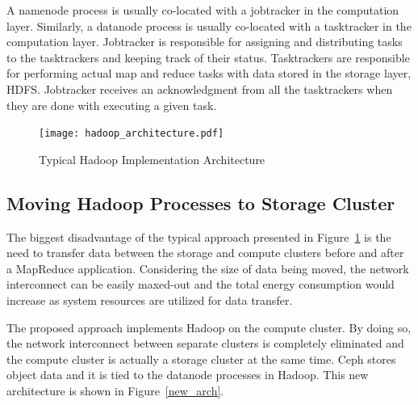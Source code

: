 \documentclass[preprint,12pt]{elsarticle}
\begin{document}
A namenode process is usually co-located with a jobtracker in the computation layer. Similarly,
a datanode process is usually co-located with a tasktracker in the computation layer. Jobtracker
is responsible for assigning and distributing tasks to the tasktrackers and keeping track of
their status. Tasktrackers are responsible for performing actual map and reduce tasks with
data stored in the storage layer, HDFS. Jobtracker receives an acknowledgment from all the
tasktrackers when they are done with executing a given task.

\begin{figure}[!htbp]
\centering
\texttt{[image: hadoop\_architecture.pdf]}
\caption{Typical Hadoop Implementation Architecture}
\label{hadoop_arch}
\end{figure}

\subsection{Moving Hadoop Processes to Storage Cluster}
The biggest disadvantage of the typical approach presented in Figure~\ref{hadoop_arch}
is the need to transfer data between the storage and compute clusters before and
after a MapReduce application. Considering the size of data being moved, the network
interconnect can be easily maxed-out and the total energy consumption would increase
as system resources are utilized for data transfer.

The proposed approach implements Hadoop on the compute cluster. By doing so, the network
interconnect between separate clusters is completely eliminated and the compute cluster is
actually a storage cluster at the same time. Ceph stores object data and it is tied to
the datanode processes in Hadoop. This new architecture is shown in Figure~\ref{new_arch}.
\end{document}
